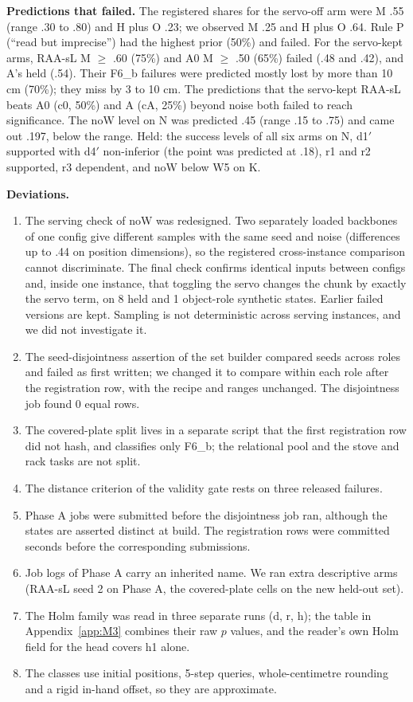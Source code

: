 \textbf{Predictions that failed.} The registered shares for the \pizero{} servo-off arm were M .55 (range .30 to .80) and H plus O .23; we observed M .25 and H plus O .64. Rule P (``read but imprecise'') had the highest prior (50\%) and failed. For the servo-kept arms, RAA-sL M $\ge$ .60 (75\%) and A0 M $\ge$ .50 (65\%) failed (.48 and .42), and A's held (.54). Their F6\_b failures were predicted mostly lost by more than 10 cm (70\%); they miss by 3 to 10 cm. The predictions that the servo-kept RAA-sL beats A0 (c0, 50\%) and A (cA, 25\%) beyond noise both failed to reach significance. The noW level on N was predicted .45 (range .15 to .75) and came out .197, below the range. Held: the success levels of all six arms on N, d1$'$ supported with d4$'$ non-inferior (the point was predicted at \mi.18), r1 and r2 supported, r3 dependent, and noW below W5 on K.

\textbf{Deviations.}
\begin{enumerate}
\item The serving check of noW was redesigned. Two separately loaded backbones of one config give different samples with the same seed and noise (differences up to .44 on position dimensions), so the registered cross-instance comparison cannot discriminate. The final check confirms identical inputs between configs and, inside one instance, that toggling the servo changes the chunk by exactly the servo term, on 8 held and 1 object-role synthetic states. Earlier failed versions are kept. Sampling is not deterministic across serving instances, and we did not investigate it.
\item The seed-disjointness assertion of the set builder compared seeds across roles and failed as first written; we changed it to compare within each role after the registration row, with the recipe and ranges unchanged. The disjointness job found 0 equal rows.
\item The covered-plate split lives in a separate script that the first registration row did not hash, and classifies only F6\_b; the relational pool and the stove and rack tasks are not split.
\item The distance criterion of the validity gate rests on three released failures.
\item Phase A jobs were submitted before the disjointness job ran, although the states are asserted distinct at build. The registration rows were committed seconds before the corresponding submissions.
\item Job logs of Phase A carry an inherited name. We ran extra descriptive arms (RAA-sL seed 2 on Phase A, the \pizero{} covered-plate cells on the new held-out set).
\item The Holm family was read in three separate runs (d, r, h); the table in Appendix~\ref{app:M3} combines their raw $p$ values, and the reader's own Holm field for the head covers h1 alone.
\item The classes use initial positions, 5-step queries, whole-centimetre rounding and a rigid in-hand offset, so they are approximate.
\end{enumerate}


